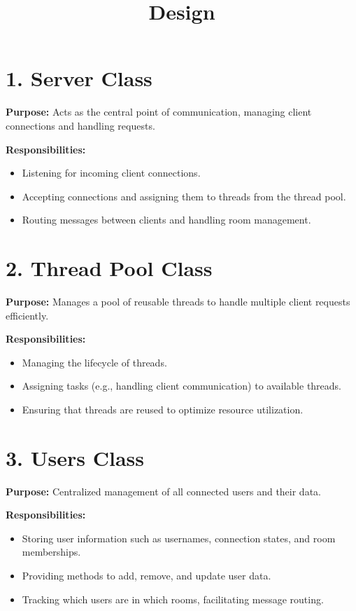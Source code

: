 \documentclass{article}
\title{Design}
\date{}
\begin{document}
\maketitle

\section*{1. Server Class}
\textbf{Purpose:} Acts as the central point of communication, managing client connections and handling requests.

\textbf{Responsibilities:}
\begin{itemize}
    \item Listening for incoming client connections.
    \item Accepting connections and assigning them to threads from the thread pool.
    \item Routing messages between clients and handling room management.
\end{itemize}

\section*{2. Thread Pool Class}
\textbf{Purpose:} Manages a pool of reusable threads to handle multiple client requests efficiently.

\textbf{Responsibilities:}
\begin{itemize}
    \item Managing the lifecycle of threads.
    \item Assigning tasks (e.g., handling client communication) to available threads.
    \item Ensuring that threads are reused to optimize resource utilization.
\end{itemize}

\section*{3. Users Class}
\textbf{Purpose:} Centralized management of all connected users and their data.

\textbf{Responsibilities:}
\begin{itemize}
    \item Storing user information such as usernames, connection states, and room memberships.
    \item Providing methods to add, remove, and update user data.
    \item Tracking which users are in which rooms, facilitating message routing.
\end{itemize}
\end{document}
